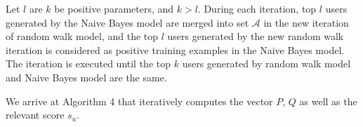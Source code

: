 \documentclass{article}
\begin{document}

Let $l$ are $k$ be positive parameters, and $k > l$. During each iteration, top $l$ users generated by the Naive Bayes model are merged into set $\mathcal{A}$ in the new iteration of random walk model, and the top $l$ users generated by the new random walk iteration is considered as positive training examples in the Naive Bayes model. The iteration is executed until the top $k$ users generated by random walk model and Naive Bayes model are the same.

We arrive at Algorithm 4 that iteratively computes the vector $P$, $Q$ as well as the relevant score $s_u$.

\ifx \allfiles \undefined
\end{document}
